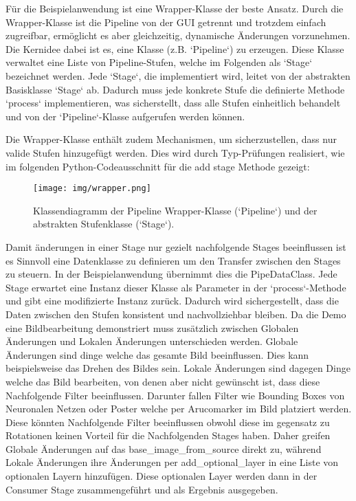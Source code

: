 \documentclass[a4paper]{article} %
\begin{document}
Für die Beispielanwendung ist eine Wrapper-Klasse der beste Ansatz. Durch die Wrapper-Klasse ist die Pipeline von der GUI getrennt und trotzdem einfach zugreifbar, ermöglicht es aber gleichzeitig, dynamische Änderungen vorzunehmen. Die Kernidee dabei ist es, eine Klasse (z.B. `Pipeline`) zu erzeugen. Diese Klasse verwaltet eine Liste von Pipeline-Stufen, welche im Folgenden als `Stage` bezeichnet werden. Jede `Stage`, die implementiert wird, leitet von der abstrakten Basisklasse `Stage` ab. Dadurch muss jede konkrete Stufe die definierte Methode `process` implementieren, was sicherstellt, dass alle Stufen einheitlich behandelt und von der `Pipeline`-Klasse aufgerufen werden können.

Die Wrapper-Klasse enthält zudem Mechanismen, um sicherzustellen, dass nur valide Stufen hinzugefügt werden. Dies wird durch Typ-Prüfungen realisiert, wie im folgenden Python-Codeausschnitt für die add stage Methode gezeigt:

\begin{figure}[htbp]
    \centering
    \texttt{[image: img/wrapper.png]}
    \caption{Klassendiagramm der Pipeline Wrapper-Klasse (`Pipeline`) und der abstrakten Stufenklasse (`Stage`).}
    \label{fig:wrapper}
\end{figure}

Damit änderungen in einer Stage nur gezielt nachfolgende Stages beeinflussen ist es Sinnvoll eine Datenklasse zu definieren um den Transfer zwischen den Stages zu steuern. In der Beispielanwendung übernimmt dies die PipeDataClass. Jede Stage erwartet eine Instanz dieser Klasse als Parameter in der `process`-Methode und gibt eine modifizierte Instanz zurück. Dadurch wird sichergestellt, dass die Daten zwischen den Stufen konsistent und nachvollziehbar bleiben.
Da die Demo eine Bildbearbeitung demonstriert muss zusätzlich zwischen Globalen Änderungen und Lokalen Änderungen unterschieden werden. Globale Änderungen sind dinge welche das gesamte Bild beeinflussen. Dies kann beispielsweise das Drehen des Bildes sein. Lokale Änderungen sind dagegen Dinge welche das Bild bearbeiten, von denen aber nicht gewünscht ist, dass diese Nachfolgende Filter beeinflussen. Darunter fallen Filter wie Bounding Boxes von Neuronalen Netzen oder Poster welche per Arucomarker im Bild platziert werden. Diese könnten Nachfolgende Filter beeinflussen obwohl diese im gegensatz zu Rotationen keinen Vorteil für die Nachfolgenden Stages haben. Daher greifen Globale Änderungen auf das base_image_from_source direkt zu, während Lokale Änderungen ihre Änderungen per add_optional_layer in eine Liste von optionalen Layern hinzufügen. Diese optionalen Layer werden dann in der Consumer Stage zusammengeführt und als Ergebnis ausgegeben.
\end{document}
